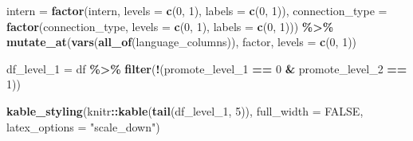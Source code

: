 \documentclass[11pt,]{article}
\newenvironment{Shaded}{\begin{snugshade}}{\end{snugshade}}
\newcommand{\AttributeTok}[1]{\textcolor[rgb]{0.13,0.29,0.53}{#1}}
\newcommand{\ConstantTok}[1]{\textcolor[rgb]{0.56,0.35,0.01}{#1}}
\newcommand{\DecValTok}[1]{\textcolor[rgb]{0.00,0.00,0.81}{#1}}
\newcommand{\FunctionTok}[1]{\textcolor[rgb]{0.13,0.29,0.53}{\textbf{#1}}}
\newcommand{\NormalTok}[1]{#1}
\newcommand{\OtherTok}[1]{\textcolor[rgb]{0.56,0.35,0.01}{#1}}
\newcommand{\SpecialCharTok}[1]{\textcolor[rgb]{0.81,0.36,0.00}{\textbf{#1}}}
\newcommand{\StringTok}[1]{\textcolor[rgb]{0.31,0.60,0.02}{#1}}
\begin{document}
\begin{Shaded}
\begin{Highlighting}[]
         \AttributeTok{intern =} \FunctionTok{factor}\NormalTok{(intern, }
                         \AttributeTok{levels =} \FunctionTok{c}\NormalTok{(}\DecValTok{0}\NormalTok{, }\DecValTok{1}\NormalTok{), }
                         \AttributeTok{labels =} \FunctionTok{c}\NormalTok{(}\DecValTok{0}\NormalTok{, }\DecValTok{1}\NormalTok{)),}
         \AttributeTok{connection\_type =} \FunctionTok{factor}\NormalTok{(connection\_type, }
                                  \AttributeTok{levels =} \FunctionTok{c}\NormalTok{(}\DecValTok{0}\NormalTok{, }\DecValTok{1}\NormalTok{), }
                                  \AttributeTok{labels =} \FunctionTok{c}\NormalTok{(}\DecValTok{0}\NormalTok{, }\DecValTok{1}\NormalTok{))) }\SpecialCharTok{\%\textgreater{}\%} 
  \FunctionTok{mutate\_at}\NormalTok{(}\FunctionTok{vars}\NormalTok{(}\FunctionTok{all\_of}\NormalTok{(language\_columns)), factor,}
            \AttributeTok{levels =} \FunctionTok{c}\NormalTok{(}\DecValTok{0}\NormalTok{, }\DecValTok{1}\NormalTok{))}

\NormalTok{df\_level\_1 }\OtherTok{=}\NormalTok{ df }\SpecialCharTok{\%\textgreater{}\%} \FunctionTok{filter}\NormalTok{(}\SpecialCharTok{!}\NormalTok{(promote\_level\_1 }\SpecialCharTok{==}  \DecValTok{0} \SpecialCharTok{\&}\NormalTok{ promote\_level\_2 }\SpecialCharTok{==} \DecValTok{1}\NormalTok{)) }

\FunctionTok{kable\_styling}\NormalTok{(knitr}\SpecialCharTok{::}\FunctionTok{kable}\NormalTok{(}\FunctionTok{tail}\NormalTok{(df\_level\_1, }\DecValTok{5}\NormalTok{)), }
              \AttributeTok{full\_width =} \ConstantTok{FALSE}\NormalTok{, }\AttributeTok{latex\_options =} \StringTok{"scale\_down"}\NormalTok{)}
\end{Highlighting}
\end{Shaded}
\end{document}
